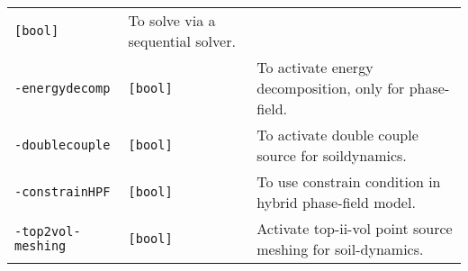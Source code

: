 \begin{longtable}[]{@{}lll@{}}
\begin{minipage}[t]{0.09\columnwidth}
\lstinline![bool]!\strut
\end{minipage} & \begin{minipage}[t]{0.56\columnwidth}\raggedright\strut
To solve via a sequential solver.\strut
\end{minipage}\tabularnewline
\begin{minipage}[t]{0.26\columnwidth}\raggedright\strut
\lstinline!-energydecomp!\strut
\end{minipage} & \begin{minipage}[t]{0.09\columnwidth}\raggedright\strut
\lstinline![bool]!\strut
\end{minipage} & \begin{minipage}[t]{0.56\columnwidth}\raggedright\strut
To activate energy decomposition, only for phase-field.\strut
\end{minipage}\tabularnewline
\begin{minipage}[t]{0.26\columnwidth}\raggedright\strut
\lstinline!-doublecouple!\strut
\end{minipage} & \begin{minipage}[t]{0.09\columnwidth}\raggedright\strut
\lstinline![bool]!\strut
\end{minipage} & \begin{minipage}[t]{0.56\columnwidth}\raggedright\strut
To activate double couple source for soildynamics.\strut
\end{minipage}\tabularnewline
\begin{minipage}[t]{0.26\columnwidth}\raggedright\strut
\lstinline!-constrainHPF!\strut
\end{minipage} & \begin{minipage}[t]{0.09\columnwidth}\raggedright\strut
\lstinline![bool]!\strut
\end{minipage} & \begin{minipage}[t]{0.56\columnwidth}\raggedright\strut
To use constrain condition in hybrid phase-field model.\strut
\end{minipage}\tabularnewline
\begin{minipage}[t]{0.26\columnwidth}\raggedright\strut
\lstinline!-top2vol-meshing!\strut
\end{minipage} & \begin{minipage}[t]{0.09\columnwidth}\raggedright\strut
\lstinline![bool]!\strut
\end{minipage} & \begin{minipage}[t]{0.56\columnwidth}\raggedright\strut
Activate top-ii-vol point source meshing for soil-dynamics.\strut
\end{minipage}\tabularnewline

\end{longtable}
